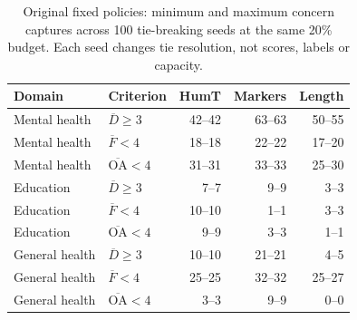 \begin{table}[p]
\centering\footnotesize
\caption{Original fixed policies: minimum and maximum concern captures across 100 tie-breaking seeds at the same 20\% budget. Each seed changes tie resolution, not scores, labels or capacity.}
\label{tab:ties}
\begin{tabular}{llrrr}
\toprule
Domain & Criterion & HumT & Markers & Length \\
\midrule
Mental health & $\overline D\geq3$ & 42--42 & 63--63 & 50--55 \\
Mental health & $\overline F<4$ & 18--18 & 22--22 & 17--20 \\
Mental health & $\overline{\mathrm{OA}}<4$ & 31--31 & 33--33 & 25--30 \\
Education & $\overline D\geq3$ & 7--7 & 9--9 & 3--3 \\
Education & $\overline F<4$ & 10--10 & 1--1 & 3--3 \\
Education & $\overline{\mathrm{OA}}<4$ & 9--9 & 3--3 & 1--1 \\
General health & $\overline D\geq3$ & 10--10 & 21--21 & 4--5 \\
General health & $\overline F<4$ & 25--25 & 32--32 & 25--27 \\
General health & $\overline{\mathrm{OA}}<4$ & 3--3 & 9--9 & 0--0 \\
\bottomrule
\end{tabular}
\end{table}
